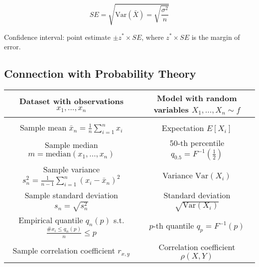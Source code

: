 \vspace{-20pt}

$$SE = \sqrt{\text{Var}(\bar{X}) = \sqrt{\frac{\sigma^2}{n}}}$$

\vspace{-10pt}

Confidence interval: point estimate $\pm z^* \times SE$, where $z^* \times SE$ is the margin of error.

\subsection{Connection with Probability Theory}


\vspace{10pt}

\begin{center}
\begin{tabular}{c|c}
    \textbf{Dataset with observations} $x_1, \dots, x_n$ & \textbf{Model with random variables} $X_1, \dots, X_n \sim f$ \\[0.25cm]
    \hline \\[0.125cm]
    Sample mean $\bar{x}_n = \frac{1}{n} \sum_{i=1}^n x_i$ & Expectation $E[X_i]$ \\[0.25cm]
    Sample median $m = \text{median}(x_1, \dots, x_n)$ & 50-th percentile $q_{0.5} = F^{-1}(\frac{1}{2})$ \\[0.25cm]
    Sample variance $s_n^2 = \frac{1}{n-1} \sum_{i=1}^n (x_i - \bar{x}_n)^2$ & Variance $\text{Var}(X_i)$ \\[0.25cm]
    Sample standard deviation $s_n = \sqrt{s_n^2}$ & Standard deviation $\sqrt{\text{Var}(X_i)}$ \\[0.25cm]
    Empirical quantile $q_n(p)$ s.t. $\frac{\# x_i \leq q_n(p)}{n} \leq p$ & $p$-th quantile $q_p = F^{-1}(p)$ \\[0.25cm]
    Sample correlation coefficient $ r_{x, y}$ & Correlation coefficient $\rho(X, Y)$
\end{tabular}
\end{center}

